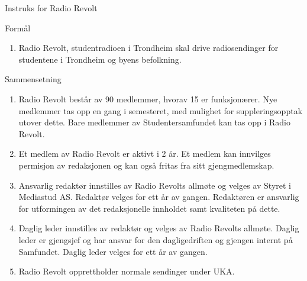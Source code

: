 \begin{instruks*}{Instruks for Radio Revolt}

    \begin{instruksledd}{Formål}
        \begin{enumerate}
            \item Radio Revolt, studentradioen i Trondheim skal drive radiosendinger for studentene
                i Trondheim og byens befolkning.
        \end{enumerate}
    \end{instruksledd}

    \begin{instruksledd}{Sammensetning}
        \begin{enumerate}
            \item Radio Revolt består av 90 medlemmer, hvorav 15 er funksjonærer. Nye medlemmer tas
                opp en gang i semesteret, med mulighet for suppleringsopptak utover dette. Bare medlemmer av
                Studentersamfundet kan tas opp i Radio Revolt.
            \item Et medlem av Radio Revolt er aktivt i 2 år. Et medlem kan innvilges permisjon av
                redaksjonen og kan også fritas fra sitt gjengmedlemskap.
            \item Ansvarlig redaktør innstilles av Radio Revolts allmøte og velges av Styret i
                Mediastud AS. Redaktør velges for ett år av gangen. Redaktøren er ansvarlig for utformingen av det
                redaksjonelle innholdet samt kvaliteten på dette.
            \item Daglig leder innstilles av redaktør og velges av Radio Revolts allmøte.
                Daglig leder er gjengsjef og har ansvar for den dagligedriften og gjengen internt på Samfundet.
                Daglig leder velges for ett år av gangen.
            \item Radio Revolt opprettholder normale sendinger under UKA.
        \end{enumerate}
    \end{instruksledd}
    

\end{instruks*}
